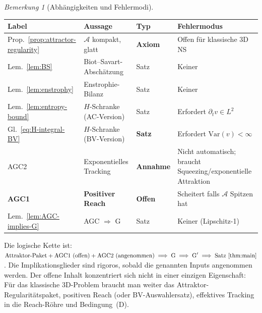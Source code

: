 \documentclass[12pt,a4paper]{article}
\theoremstyle{definition}
\theoremstyle{plain}
\theoremstyle{remark}
\newtheorem{remark}[definition]{Bemerkung}
\begin{document}
\begin{remark}[Abhängigkeiten und Fehlermodi]\label{rem:dependencies}
\mbox{}

\begin{center}
\begin{tabularx}{\textwidth}{@{}lYlY@{}}
\hline
\textbf{Label} & \textbf{Aussage} & \textbf{Typ} & \textbf{Fehlermodus} \\
\hline
Prop.~\ref{prop:attractor-regularity} &
  $\mathcal{A}$ kompakt, glatt &
  \textbf{Axiom} & Offen für klassische 3D NS \\
Lem.~\ref{lem:BS} &
  Biot--Savart-Abschätzung &
  Satz & Keiner \\
Lem.~\ref{lem:enstrophy} &
  Enstrophie-Bilanz &
  Satz & Keiner \\
Lem.~\ref{lem:entropy-bound} &
  $H$-Schranke (AC-Version) &
  Satz & Erfordert $\partial_t v \in L^2$ \\
Gl.~\eqref{eq:H-integral-BV} &
  $H$-Schranke (BV-Version) &
  \textbf{Satz} & Erfordert $\mathrm{Var}(v) < \infty$ \\
AGC2 &
  Exponentielles Tracking &
  \textbf{Annahme} & Nicht automatisch; braucht Squeezing/exponentielle Attraktion \\
\textbf{AGC1} &
  \textbf{Positiver Reach} &
  \textbf{Offen} &
  Scheitert falls $\mathcal{A}$ Spitzen hat \\
Lem.~\ref{lem:AGC-implies-G} &
  AGC $\Rightarrow$ G &
  Satz & Keiner (Lipschitz-1) \\
\hline
\end{tabularx}
\end{center}

\medskip\noindent
Die logische Kette ist:
$\textup{Attraktor-Paket} + \textup{AGC1 (offen)} + \textup{AGC2 (angenommen)}
\;\Longrightarrow\;
\textup{G}
\;\Longrightarrow\;
\textup{G}'
\;\Longrightarrow\;
\textup{Satz~\ref{thm:main}}$.
Die Implikationsglieder sind rigoros, sobald die genannten Inputs
angenommen werden. Der offene Inhalt konzentriert sich nicht in einer
einzigen Eigenschaft: Für das klassische 3D-Problem braucht man weiter
das Attraktor-Regularitätspaket, positiven Reach (oder BV-Auswahlersatz),
effektives Tracking in die Reach-Röhre und Bedingung~(D).
\end{remark}
\end{document}
